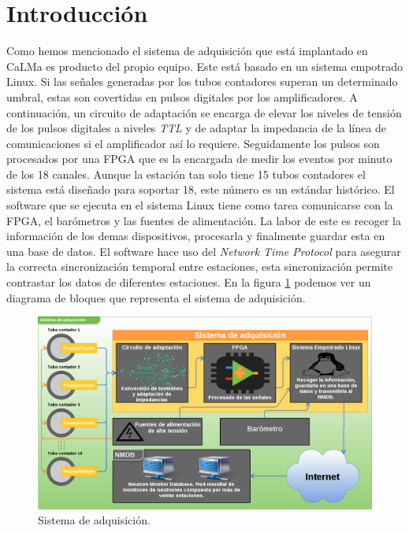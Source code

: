     \section{Introducción}
        Como hemos mencionado el sistema de adquisición que está implantado en
        CaLMa es producto del propio equipo\cite{Garcia2014}. Este está basado en
        un sistema empotrado Linux. Si las señales generadas por los tubos
        contadores superan un determinado umbral, estas son covertidas en pulsos
        digitales por los amplificadores. A continuación, un circuito de adaptación
        se encarga de elevar los niveles de tensión de los pulsos digitales a
        niveles \emph{TTL} y de adaptar la impedancia de la línea de comunicaciones
        si el amplificador así lo requiere. Seguidamente los pulsos son procesados
        por una FPGA que es la encargada de medir los eventos por minuto de los 18
        canales. Aunque la estación tan solo tiene 15 tubos contadores el sistema
        está diseñado para soportar 18, este número es un estándar histórico. El
        software que se ejecuta en el sistema Linux tiene como tarea comunicarse
        con la FPGA, el barómetros y las fuentes de alimentación. La labor de este
        es recoger la información de los demas dispositivos, procesarla y
        finalmente guardar esta en una base de datos. El software hace uso del
        \emph{Network Time Protocol} para asegurar la correcta sincronización
        temporal entre estaciones, esta sincronización permite contrastar los datos
        de diferentes estaciones. En la figura \ref{fig:acqsis} podemos ver un
        diagrama de bloques que representa el sistema de adquisición.
        \begin{figure}[h]
            \centering
            \includegraphics[keepaspectratio, width=1\textwidth]{./img/AcqSis.png}
            \caption{Sistema de adquisición.}
            \label{fig:acqsis}
        \end{figure}

